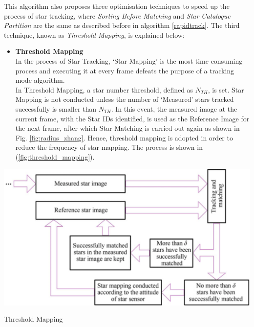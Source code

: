\documentclass[../../main.tex]{subfiles}
\begin{document}
This algorithm also proposes three optimisation techniques to speed up the process of star tracking, where \textit{Sorting Before Matching} and \textit{Star Catalogue Partition} are the same as described before in algorithm \ref{rapidtrack}. The third technique, known as \textit{Threshold Mapping}, is explained below: 
\begin{itemize}
    \item \textbf{Threshold Mapping}\\ \label{threshold_mapping}
    In the process of Star Tracking, `Star Mapping' is the most time consuming process and executing it at every frame defeats the purpose of a tracking mode algorithm. \\
    In Threshold Mapping, a star number threshold, defined as $N_{\textit{TH}}$, is set. Star Mapping is not conducted unless the number of `Measured' stars tracked successfully is smaller than $N_{\textit{TH}}$. In this event, the measured image at the current frame, with the Star IDs identified, is used as the Reference Image for the next frame, after which Star Matching is carried out again as shown in Fig. \ref{fig:radius_zhang}. Hence, threshold mapping is adopted in order to reduce the frequency of star mapping. The process is shown in (\ref{fig:threshold_mapping}).
\end{itemize}
\begin{Flowchart}
        \centering
        \includegraphics[scale=0.55]{Figures/GNC/threshold_mapping.png}
        \caption{Threshold Mapping}
        \label{fig:threshold_mapping}
\end{Flowchart}
\end{document}
